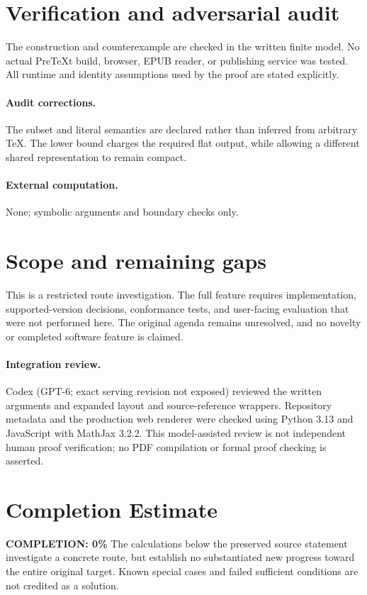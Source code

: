 \documentclass[11pt]{article}
\begin{document}
\section{Verification and adversarial audit}
The construction and counterexample are checked in the written finite model. No actual PreTeXt build, browser, EPUB reader, or publishing service was tested. All runtime and identity assumptions used by the proof are stated explicitly.
\paragraph{Audit corrections.} The subset and literal semantics are declared rather than inferred from arbitrary TeX. The lower bound charges the required flat output, while allowing a different shared representation to remain compact.
\paragraph{External computation.} None; symbolic arguments and boundary checks only.
\section{Scope and remaining gaps}
This is a restricted route investigation. The full feature requires implementation, supported-version decisions, conformance tests, and user-facing evaluation that were not performed here. The original agenda remains unresolved, and no novelty or completed software feature is claimed.
\paragraph{Integration review.} Codex (GPT-6; exact serving revision not exposed) reviewed the written arguments and expanded layout and source-reference wrappers. Repository metadata and the production web renderer were checked using Python 3.13 and JavaScript with MathJax 3.2.2. This model-assisted review is not independent human proof verification; no PDF compilation or formal proof checking is asserted.

\section{Completion Estimate}
\noindent\textbf{COMPLETION: 0\%}
The calculations below the preserved source statement investigate a concrete route,
but establish no substantiated new progress toward the entire original target.
Known special cases and failed sufficient conditions are not credited as a solution.
\end{document}

